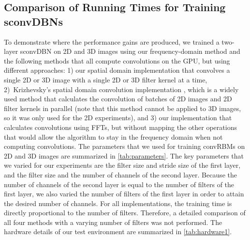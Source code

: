 \subsection[Comparison of running times for training sconvDBNs]{Comparison of
Running Times for Training sconvDBNs}

To demonstrate where the performance gains are produced, we trained a two-layer
sconvDBN on 2D and 3D images using our frequency-domain method and the following
methods that all compute convolutions on the GPU, but using different
approaches: 1) our spatial domain implementation that convolves a single 2D or
3D image with a single 2D or 3D filter kernel at a time, 2)~Krizhevsky's spatial
domain convolution implementation \citep{krizhevsky2012b}, which is a widely
used method \citep[e.g.,][]{scherer2010,hinton2012,zeiler2013} that calculates
the convolution of batches of 2D images and 2D filter kernels in parallel (note
that this method cannot be applied to 3D images, so it was only used for the 2D
experiments), and 3) our implementation that calculates convolutions using FFTs,
but without mapping the other operations that would allow the algorithm to stay
in the frequency domain when not computing convolutions. The parameters that we
used for training convRBMs on 2D and 3D images are summarized in
\ref{tab:parameters}. The key parameters that we varied for our experiments are
the filter size and stride size of the first layer, and the filter size and the
number of channels of the second layer. Because the number of channels of the
second layer is equal to the number of filters of the first layer, we also
varied the number of filters of the first layer in order to attain the desired
number of channels. For all implementations, the training time is directly
proportional to the number of filters. Therefore, a detailed comparison of all
four methods with a varying number of filters was not performed. The hardware
details of our test environment are summarized in \ref{tab:hardware1}.

